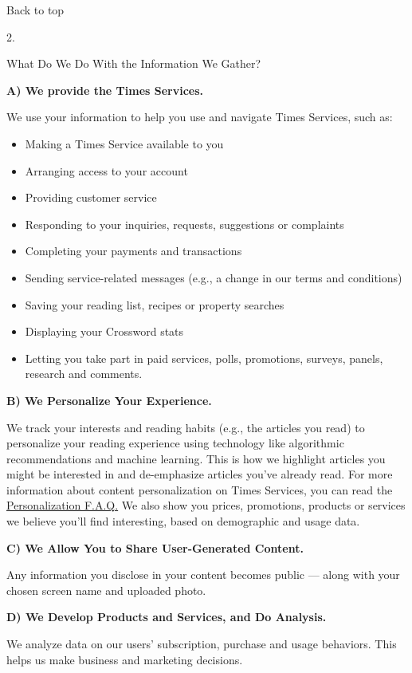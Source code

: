 Back to top

2.

What Do We Do With the Information We Gather?

\textbf{A) We provide the Times Services.}

We use your information to help you use and navigate Times Services,
such as:

\begin{itemize}
\tightlist
\item
  Making a Times Service available to you
\item
  Arranging access to your account
\item
  Providing customer service
\item
  Responding to your inquiries, requests, suggestions or complaints
\item
  Completing your payments and transactions
\item
  Sending service-related messages (e.g., a change in our terms and
  conditions)
\item
  Saving your reading list, recipes or property searches
\item
  Displaying your Crossword stats
\item
  Letting you take part in paid services, polls, promotions, surveys,
  panels, research and comments.
\end{itemize}

\textbf{B) We Personalize Your Experience.}

We track your interests and reading habits (e.g., the articles you read)
to personalize your reading experience using technology like algorithmic
recommendations and machine learning. This is how we highlight articles
you might be interested in and de-emphasize articles you've already
read. For more information about content personalization on Times
Services, you can read the
\href{https://help.nytimes3xbfgragh.onion/hc/en-us/articles/360003965994-Personalization}{Personalization
F.A.Q.} We also show you prices, promotions, products or services we
believe you'll find interesting, based on demographic and usage data.

\textbf{C) We Allow You to Share User-Generated Content.}

Any information you disclose in your content becomes public --- along
with your chosen screen name and uploaded photo.

\textbf{D) We Develop Products and Services, and Do Analysis.}

We analyze data on our users' subscription, purchase and usage
behaviors. This helps us make business and marketing decisions.

